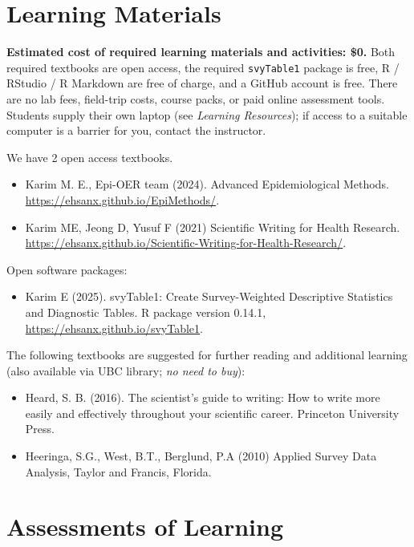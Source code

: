 \documentclass[
]{article}
\providecommand{\tightlist}{%
  \setlength{\itemsep}{0pt}\setlength{\parskip}{0pt}}
\begin{document}
\section{Learning Materials}\label{learning-materials}

\textbf{Estimated cost of required learning materials and activities:
\$0.} Both required textbooks are open access, the required
\texttt{svyTable1} package is free, R / RStudio / R Markdown are free of
charge, and a GitHub account is free. There are no lab fees, field-trip
costs, course packs, or paid online assessment tools. Students supply
their own laptop (see \emph{Learning Resources}); if access to a
suitable computer is a barrier for you, contact the instructor.

We have 2 open access textbooks.

\begin{itemize}
\tightlist
\item
  Karim M. E., Epi-OER team (2024). Advanced Epidemiological Methods.
  \url{https://ehsanx.github.io/EpiMethods/}.
\item
  Karim ME, Jeong D, Yusuf F (2021) Scientific Writing for Health
  Research.
  \url{https://ehsanx.github.io/Scientific-Writing-for-Health-Research/}.
\end{itemize}

Open software packages:

\begin{itemize}
\tightlist
\item
  Karim E (2025). svyTable1: Create Survey-Weighted Descriptive
  Statistics and Diagnostic Tables. R package version 0.14.1,
  \url{https://ehsanx.github.io/svyTable1}.
\end{itemize}

The following textbooks are suggested for further reading and additional
learning (also available via UBC library; \emph{no need to buy}):

\begin{itemize}
\tightlist
\item
  Heard, S. B. (2016). The scientist's guide to writing: How to write
  more easily and effectively throughout your scientific career.
  Princeton University Press.
\item
  Heeringa, S.G., West, B.T., Berglund, P.A (2010) Applied Survey Data
  Analysis, Taylor and Francis, Florida.
\end{itemize}

\section{Assessments of Learning}\label{assessments-of-learning}
\end{document}
